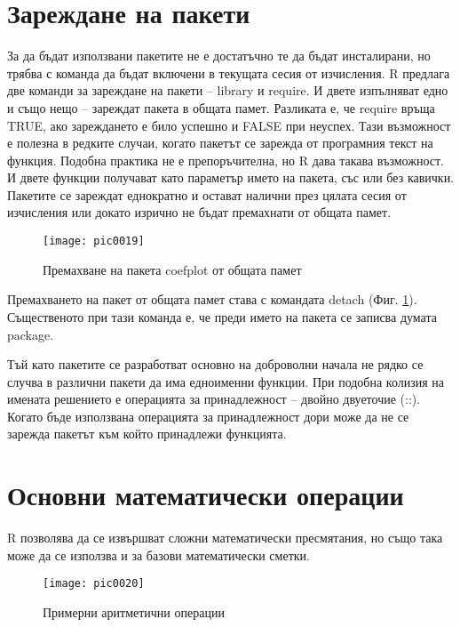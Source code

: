 \section{Зареждане на пакети}

За да бъдат използвани пакетите не е достатъчно те да бъдат инсталирани, но трябва с команда да бъдат включени в текущата сесия от изчисления. R предлага две команди за зареждане на пакети – library и require. И двете изпълняват едно и също нещо – зареждат пакета в общата памет. Разликата е, че require връща TRUE, ако зареждането е било успешно и FALSE при неуспех. Тази възможност е полезна в редките случаи, когато пакетът се зарежда от програмния текст на функция. Подобна практика не е препоръчителна, но R дава такава възможност. И двете функции получават като параметър името на пакета, със или без кавички. Пакетите се зареждат еднократно и остават налични през цялата сесия от изчисления или докато изрично не бъдат премахнати от общата памет. 

\begin{figure}[h!]
  \centering
  \texttt{[image: pic0019]}
  \caption{Премахване на пакета coefplot от общата памет}
\label{figure0019}
\end{figure}
\FloatBarrier

Премахването на пакет от общата памет става с командата detach (Фиг. \ref{figure0019}). Същественото при тази команда е, че преди името на пакета се записва думата package. 

Тъй като пакетите се разработват основно на доброволни начала не рядко се случва в различни пакети да има едноименни функции. При подобна колизия на имената решението е операцията за принадлежност – двойно двуеточие (::). Когато бъде използвана операцията за принадлежност дори може да не се зарежда пакетът към който принадлежи функцията. 

\section{Основни математически операции}

R позволява да се извършват сложни математически пресмятания, но също така може да се използва и за базови математически сметки. 

\begin{figure}[h!]
  \centering
  \texttt{[image: pic0020]}
  \caption{Примерни аритметични операции}
\label{figure0020}
\end{figure}
\FloatBarrier

